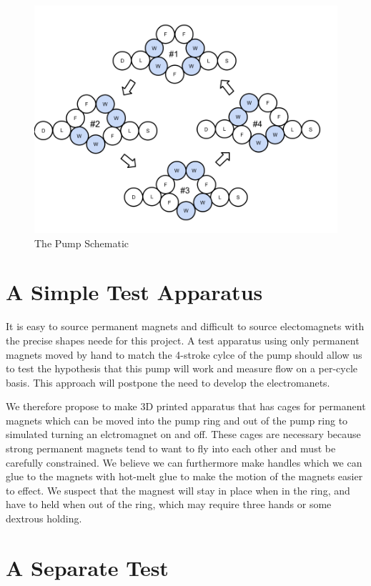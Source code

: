 \documentclass[12pt]{article}
\begin{document}
\begin{figure}
\centerline{\includegraphics[width=5in]{images/PumpPhases.png}}
\caption{The Pump Schematic}
\label{fig_pumpschematic}
\end{figure}

\section{A Simple Test Apparatus}

It is easy to source permanent magnets and difficult to source electomagnets with
the precise shapes neede for this project.
A test apparatus using only permanent magnets moved by hand to match the 4-stroke cylce
of the pump should allow us to test the hypothesis that this pump will work and measure
flow on a per-cycle basis.
This approach will postpone the need to develop the electromanets.

We therefore propose to make 3D printed apparatus that has cages for permanent magnets
which can be moved into the pump ring and out of the pump ring to simulated turning
an elctromagnet on and off.
These cages are necessary because strong permanent magnets tend to want to fly into
each other and must be carefully constrained.
We believe we can furthermore make handles which we can glue to the magnets with
hot-melt glue to make the motion of the magnets easier to effect.
We suspect that the magnest will stay in place when in the ring,
and have to held when out of the ring, which may require three hands or
some dextrous holding.

\section{A Separate Test}
\end{document}
